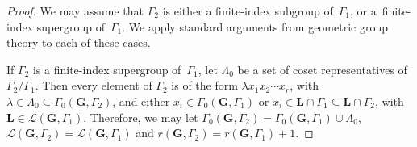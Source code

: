 \documentclass[pdftex]{sigma}
\newcommand{\Ga}{\mathbf{G}}
\newcommand{\La}{\mathbf{L}}
\newcommand{\subgroups}{\mathcal{L}}
\numberwithin{equation}{section}
\theoremstyle{definition}
\begin{document}
\begin{proof}
We may assume that $\Gamma_2$ is either a finite-index subgroup of~$\Gamma_1$, or a~finite-index supergroup of~$\Gamma_1$. We apply standard arguments from geometric group theory to each of these cases.

If $\Gamma_2$ is a finite-index supergroup of~$\Gamma_1$, let $\Lambda_0$ be a set of coset representatives of $\Gamma_2 / \Gamma_1$. Then every element of $\Gamma_2$ is of the form $\lambda x_1 x_2 \cdots x_r$, with $\lambda \in \Lambda_0 \subseteq \Gamma_0(\Ga,\Gamma_2)$, and either $x_i \in \Gamma_0(\Ga,\Gamma_1)$ or $x_i \in \La \cap \Gamma_1 \subseteq \La \cap \Gamma_2$, with $\La \in \subgroups(\Ga,\Gamma_1)$. Therefore, we may let $\Gamma_0(\Ga,\Gamma_2) = \Gamma_0(\Ga,\Gamma_1) \cup \Lambda_0$,
$\subgroups(\Ga,\Gamma_2) = \subgroups(\Ga,\Gamma_1)$ and $r(\Ga,\Gamma_2) = r(\Ga,\Gamma_1) + 1$.


\end{proof}
\end{document}
